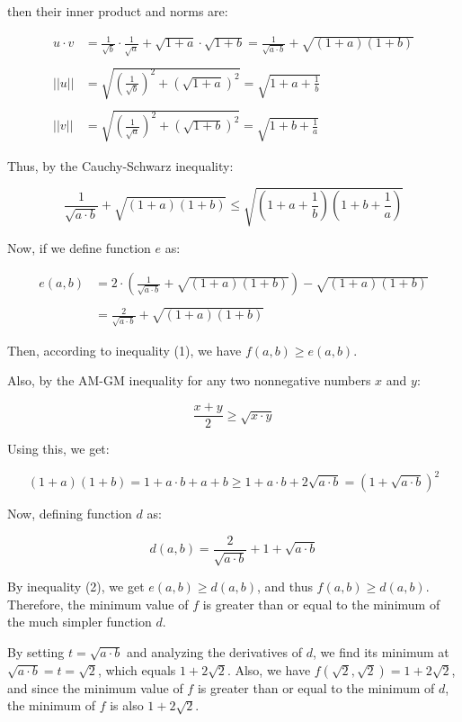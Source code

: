 \begin{solution}
then their inner product and norms are:

\[
\begin{aligned}
u \cdot v &= \frac{1}{\sqrt{b}} \cdot \frac{1}{\sqrt{a}} + \sqrt{1+a} \cdot \sqrt{1+b} = \frac{1}{\sqrt{a \cdot b}} + \sqrt{(1 + a)(1 + b)} \\\\
||u|| &= \sqrt{\left( \frac{1}{\sqrt{b}} \right)^2 + \left( \sqrt{1+a} \right)^2} = \sqrt{1 + a + \frac{1}{b}} \\\\
||v|| &= \sqrt{\left(\frac{1}{\sqrt{a}}\right)^2 + \left(\sqrt{1+b}\right)^2} = \sqrt{1 + b + \frac{1}{a}}
\end{aligned}
\]

Thus, by the Cauchy-Schwarz inequality:

\[
\frac{1}{\sqrt{a \cdot b}} + \sqrt{(1 + a)(1 + b)} \leq \sqrt{\left(1 + a + \frac{1}{b}\right)\left(1 + b + \frac{1}{a}\right)}
\tag{1}
\]

Now, if we define function $e$ as:

\[
\begin{aligned}
e(a, b) &= 2 \cdot \left(\frac{1}{\sqrt{a \cdot b}} + \sqrt{(1+a)(1+b)} \right) - \sqrt{(1+a)(1+b)} \\\\
&= \frac{2}{\sqrt{a \cdot b}} + \sqrt{(1+a)(1+b)}
\end{aligned}
\]

Then, according to inequality (1), we have $f(a,b) \geq e(a, b)$.

Also, by the AM-GM inequality for any two nonnegative numbers $x$ and $y$:

\[
\frac{x+y}{2} \geq \sqrt{x\cdot y}
\]

Using this, we get:

\[
(1+a)(1+b) = 1 + a \cdot b + a + b \geq 1 + a \cdot b + 2\sqrt{a \cdot b} = (1 + \sqrt{a \cdot b})^2
\tag{2}
\]

Now, defining function $d$ as:

\[
d(a, b) = \frac{2}{\sqrt{a \cdot b}} + 1 + \sqrt{a \cdot b}
\]

By inequality (2), we get $e(a, b) \geq d(a, b)$, and thus $f(a, b) \geq d(a, b)$. Therefore, the minimum value of $f$ is greater than or equal to the minimum of the much simpler function $d$.

By setting $t = \sqrt{a \cdot b}$ and analyzing the derivatives of $d$, we find its minimum at $\sqrt{a \cdot b} = t = \sqrt{2}$, which equals $1 + 2 \sqrt{2}$. Also, we have $f(\sqrt{2}, \sqrt{2}) = 1 + 2 \sqrt{2}$, and since the minimum value of $f$ is greater than or equal to the minimum of $d$, the minimum of $f$ is also $1 + 2 \sqrt{2}$.


\end{solution}

